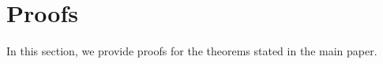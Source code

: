 \onecolumn

\section{\label{sec:proofs}Proofs}

In this section, we provide proofs for the theorems stated in the main paper.




